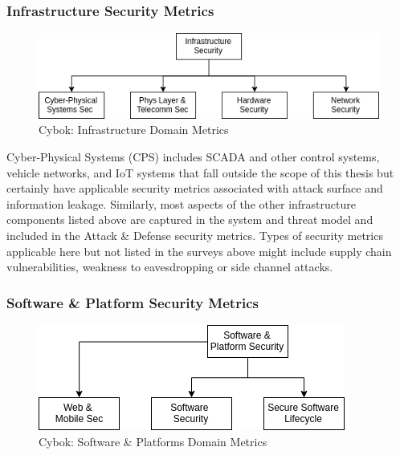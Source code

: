 

\subsubsection{Infrastructure Security Metrics}

\begin{figure}[ht]

\begin{mdframed}
\centering
\includegraphics[width=.75\linewidth]{resource/img/ch_background/cybok_metrics/cybok_infra.png}
\end{mdframed}
\caption{Cybok: Infrastructure Domain Metrics
\label{fig:background:cybok_infra_metrics}}
\end{figure} 



Cyber-Physical Systems (CPS) includes SCADA and other control systems, vehicle networks, and IoT systems that fall outside the scope of this thesis but certainly have applicable security metrics associated with attack surface and information leakage. Similarly, most aspects of the other infrastructure components listed above are captured in the system and threat model and included in the Attack \& Defense security metrics. Types of security metrics applicable here but not listed in the surveys above might include supply chain vulnerabilities, weakness to eavesdropping or side channel attacks. 

\subsubsection{Software \& Platform Security Metrics}

\begin{figure}[ht]

\begin{mdframed}
\centering
\includegraphics[width=.55\linewidth]{resource/img/ch_background/cybok_metrics/cybok_sw_platforms.png}
\end{mdframed}
\caption{Cybok: Software \& Platforms Domain Metrics
\label{fig:background:cybok_sw_metrics}}
\end{figure} 


